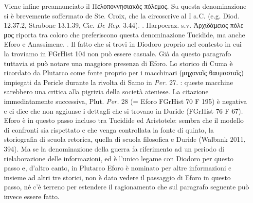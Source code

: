 {            Viene infine preannunciato il \textgreek{Πελοποννησιακὸς πόλεμος}. Su questa denominazione si è brevemente soffermato de Ste. Croix, che la circoscrive al I a.C. (e.g. Diod. 12.37.2, Strabone 13.1.39, Cic. \emph{De Rep.} 3.44). \cite[294-5]{DeSte.Croix1972}. Harpocraz. s.v. \textgreek{Ἀρχιδάμειος πόλεμος} riporta tra coloro che preferiscono questa denominazione Tucidide, ma anche Eforo e Anassimene. \cite[79]{Schepens2007}. Il fatto che si trovi in  Diodoro proprio nel contesto in cui la troviamo in FGrHist 104 non può essere casuale. Già da questo paragrafo tuttavia si può notare una maggiore presenza di Eforo. Lo storico di Cuma è ricordato da Plutarco come fonte proprio per i macchinari (\textgreek{μηχαναῖς θαυμασταῖς}) impiegati da Pericle  durante la rivolta di Samo in \emph{Per.} 27. \cite[420, n. 116 e 426]{Parmeggiani2011}: queste macchine sarebbero una critica alla pigrizia della società ateniese. La citazione immediatamente successiva, Plut. \emph{Per.} 28 (= Eforo FGrHist 70 F 195) è negativa e ci dice che non aggiunse i dettagli che si trovano in Duride (FGrHist 76 F 67). Eforo è in questo passo incluso tra Tucidide ed Aristotele: sembra che il modello di confronti sia rispettato e che venga controllata la fonte di quinto, la storiografia di scuola retorica, quella di scuola filosofica e Duride (Walbank 2011, 394). Ma se la denominazione della guerra fa riferimento ad un periodo di rielaborazione delle informazioni, ed è l'unico legame con  Diodoro per questo passo e, d'altro canto, in Plutarco Eforo è nominato per altre informazioni e insieme ad altri tre storici, non è dato vedere il passaggio di Eforo in questo passo, né c'è terreno per estendere il ragionamento che sul paragrafo seguente può invece essere fatto.     
            
}
